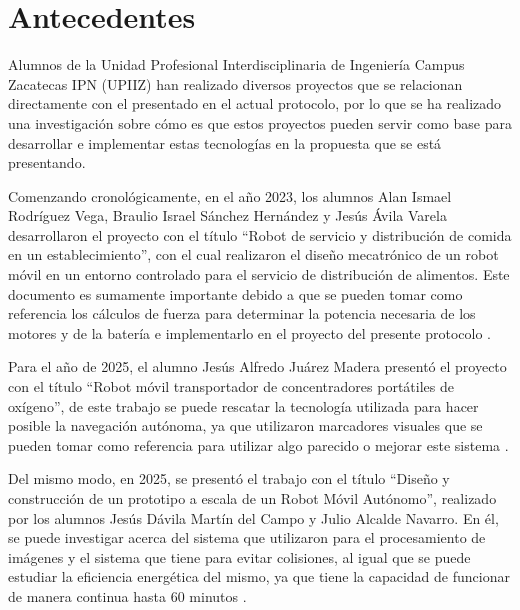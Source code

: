 
\chapter{Antecedentes}
\label{cap:antecedentes}

Alumnos de la Unidad Profesional Interdisciplinaria de Ingeniería Campus Zacatecas IPN (UPIIZ) han realizado diversos proyectos que se relacionan directamente con el presentado en el actual protocolo, por lo que se ha realizado una investigación sobre cómo es que estos proyectos pueden servir como base para desarrollar e implementar estas tecnologías en la propuesta que se está presentando.

Comenzando cronológicamente, en el año 2023, los alumnos Alan Ismael Rodríguez Vega, Braulio Israel Sánchez Hernández y Jesús Ávila Varela desarrollaron el proyecto con el título “Robot de servicio y distribución de comida en un establecimiento”, con el cual realizaron el diseño mecatrónico de un robot móvil en un entorno controlado para el servicio de distribución de alimentos. Este documento es sumamente importante debido a que se pueden tomar como referencia los cálculos de fuerza para determinar la potencia necesaria de los motores y de la batería e implementarlo en el proyecto del presente protocolo \cite{A1}.

Para el año de 2025, el alumno Jesús Alfredo Juárez Madera presentó el proyecto con el título “Robot móvil transportador de concentradores portátiles de oxígeno”, de este trabajo se puede rescatar la tecnología utilizada para hacer posible la navegación autónoma, ya que utilizaron marcadores visuales que se pueden tomar como referencia para utilizar algo parecido o mejorar este sistema \cite{A2}.

Del mismo modo, en 2025, se presentó el trabajo con el título “Diseño y construcción de un prototipo a escala de un Robot Móvil Autónomo”, realizado por los alumnos Jesús Dávila Martín del Campo y Julio Alcalde Navarro. En él, se puede investigar acerca del sistema que utilizaron para el procesamiento de imágenes y el sistema que tiene para evitar colisiones, al igual que se puede estudiar la eficiencia energética del mismo, ya que tiene la capacidad de funcionar de manera continua hasta 60 minutos \cite{A3}.

